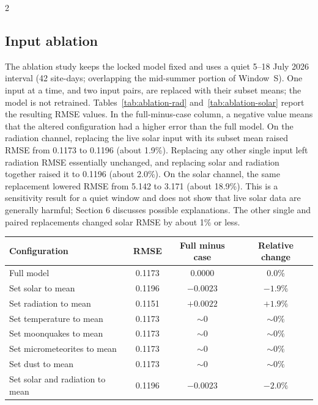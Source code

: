\begin{multicols}{2}
\subsection{Input ablation}

The ablation study keeps the locked model fixed and uses a quiet 5--18 July 2026 interval (42 site-days; overlapping the mid-summer portion of Window~S). One input at a time, and two input pairs, are replaced with their subset means; the model is not retrained. Tables~\ref{tab:ablation-rad} and~\ref{tab:ablation-solar} report the resulting RMSE values. In the full-minus-case column, a negative value means that the altered configuration had a higher error than the full model. On the radiation channel, replacing the live solar input with its subset mean raised RMSE from 0.1173 to 0.1196 (about 1.9\%). Replacing any other single input left radiation RMSE essentially unchanged, and replacing solar and radiation together raised it to 0.1196 (about 2.0\%). On the solar channel, the same replacement lowered RMSE from 5.142 to 3.171 (about 18.9\%). This is a sensitivity result for a quiet window and does not show that live solar data are generally harmful; Section 6 discusses possible explanations. The other single and paired replacements changed solar RMSE by about 1\% or less.
\end{multicols}

\begin{center}
\centering
\begin{tabular}{@{}lccc@{}}
\toprule
Configuration & RMSE & Full minus case & Relative change \\
\midrule
Full model & 0.1173 & 0.0000 & 0.0\% \\
Set solar to mean & 0.1196 & $-0.0023$ & $-1.9\%$ \\
Set radiation to mean & 0.1151 & $+0.0022$ & $+1.9\%$ \\
Set temperature to mean & 0.1173 & ${\sim}0$ & ${\sim}0\%$ \\
Set moonquakes to mean & 0.1173 & ${\sim}0$ & ${\sim}0\%$ \\
Set micrometeorites to mean & 0.1173 & ${\sim}0$ & ${\sim}0\%$ \\
Set dust to mean & 0.1173 & ${\sim}0$ & ${\sim}0\%$ \\
Set solar and radiation to mean & 0.1196 & $-0.0023$ & $-2.0\%$ \\
\bottomrule
\end{tabular}
\label{tab:ablation-rad}
\end{center}

